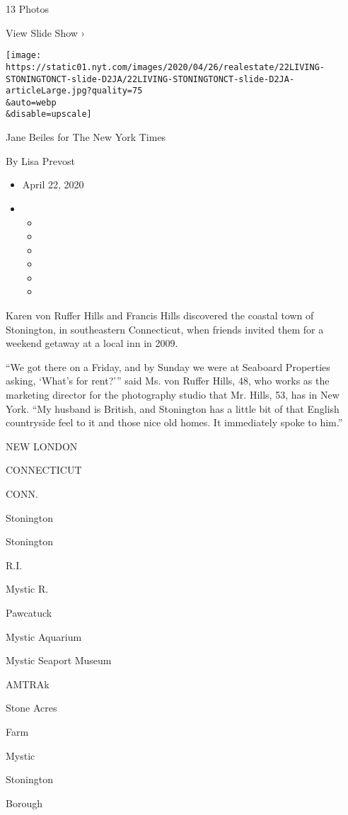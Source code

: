 13 Photos

View Slide Show ›

\texttt{[image: https://static01.nyt.com/images/2020/04/26/realestate/22LIVING-STONINGTONCT-slide-D2JA/22LIVING-STONINGTONCT-slide-D2JA-articleLarge.jpg?quality=75\\\&auto=webp\\\&disable=upscale]}

Jane Beiles for The New York Times

By Lisa Prevost

\begin{itemize}
\item
  April 22, 2020
\item
  \begin{itemize}
  \item
  \item
  \item
  \item
  \item
  \item
  \end{itemize}
\end{itemize}

Karen von Ruffer Hills and Francis Hills discovered the coastal town of
Stonington, in southeastern Connecticut, when friends invited them for a
weekend getaway at a local inn in 2009.

``We got there on a Friday, and by Sunday we were at Seaboard Properties
asking, `What's for rent?''' said Ms. von Ruffer Hills, 48, who works as
the marketing director for the photography studio that Mr. Hills, 53,
has in New York. ``My husband is British, and Stonington has a little
bit of that English countryside feel to it and those nice old homes. It
immediately spoke to him.''

NEW LONDON

CONNECTICUT

CONN.

Stonington

Stonington

R.I.

Mystic R.

Pawcatuck

Mystic Aquarium

Mystic Seaport Museum ~

AMTRAk

Stone Acres

Farm

Mystic

Stonington

Borough


